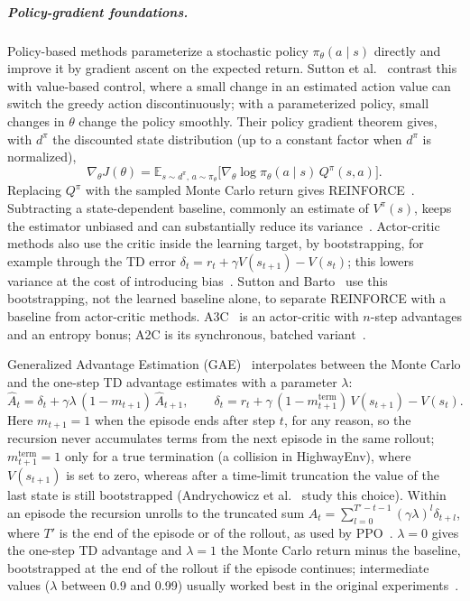 \subparagraph{Policy-gradient foundations.}
Policy-based methods parameterize a stochastic policy $\pi_\theta(a \mid s)$ directly and improve it by gradient
ascent on the expected return. Sutton et al.~\cite{sutton2000pg} contrast this with value-based control, where a small
change in an estimated action value can switch the greedy action discontinuously; with a parameterized policy, small
changes in $\theta$ change the policy smoothly. Their policy gradient theorem gives, with $d^{\pi}$ the discounted state
distribution (up to a constant factor when $d^{\pi}$ is normalized),
\begin{equation}
  \nabla_\theta J(\theta) = \mathbb{E}_{s \sim d^{\pi},\, a \sim \pi_\theta}\bigl[\nabla_\theta \log \pi_\theta(a \mid s)\, Q^{\pi}(s,a)\bigr].
  \label{eq:pg-theorem}
\end{equation}
Replacing $Q^{\pi}$ with the sampled Monte Carlo return gives REINFORCE~\cite{williams1992reinforce}. Subtracting a
state-dependent baseline, commonly an estimate of $V^{\pi}(s)$, keeps the estimator unbiased and can substantially
reduce its variance~\cite{williams1992reinforce,sutton2000pg}. Actor-critic methods also use the critic inside the
learning target, by bootstrapping, for example through the TD error
$\delta_t = r_t + \gamma V(s_{t+1}) - V(s_t)$; this lowers variance at the cost of introducing
bias~\cite{konda2000actorcritic,schulman2016gae}. Sutton and Barto~\cite[Sec.~13.5]{sutton2018rl} use this
bootstrapping, not the learned baseline alone, to separate REINFORCE with a baseline from actor-critic methods.
A3C~\cite{mnih2016a3c} is an actor-critic with $n$-step advantages and an entropy bonus; A2C is its synchronous,
batched variant~\cite{wu2017acktr}.

Generalized Advantage Estimation (GAE)~\cite{schulman2016gae} interpolates between the Monte Carlo and the one-step TD
advantage estimates with a parameter $\lambda$:
\begin{equation}
  \hat{A}_t = \delta_t + \gamma\lambda\,(1-m_{t+1})\,\hat{A}_{t+1},
  \qquad
  \delta_t = r_t + \gamma\,(1-m^{\mathrm{term}}_{t+1})\,V(s_{t+1}) - V(s_t).
  \label{eq:gae}
\end{equation}
Here $m_{t+1}=1$ when the episode ends after step $t$, for any reason, so the recursion never accumulates terms from
the next episode in the same rollout; $m^{\mathrm{term}}_{t+1}=1$ only for a true termination (a collision in
HighwayEnv), where $V(s_{t+1})$ is set to zero, whereas after a time-limit truncation the value of the last state is
still bootstrapped (Andrychowicz et al.~\cite{andrychowicz2021matters} study this choice). Within an episode the
recursion unrolls to the truncated sum $\hat{A}_t = \sum_{l=0}^{T'-t-1} (\gamma\lambda)^l \delta_{t+l}$, where $T'$ is
the end of the episode or of the rollout, as used by PPO~\cite{schulman2017ppo}. $\lambda = 0$ gives the one-step TD
advantage and $\lambda = 1$ the Monte Carlo return minus the baseline, bootstrapped at the end of the rollout if the
episode continues; intermediate values ($\lambda$ between 0.9 and 0.99) usually worked best in the original
experiments~\cite{schulman2016gae}.

